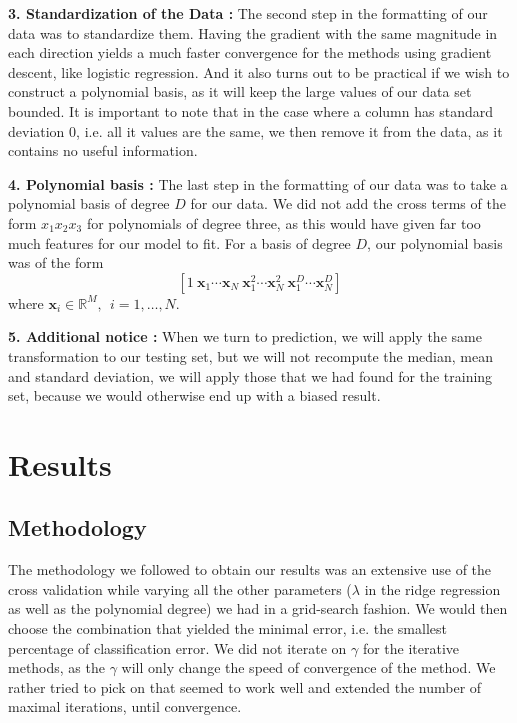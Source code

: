 \documentclass[10pt,conference,compsocconf]{IEEEtran}
\begin{document}
\textbf{3. Standardization of the Data :} The second step in the formatting of our data was to standardize them. Having the gradient with the same magnitude in each direction yields a much faster convergence for the methods using gradient descent, like logistic regression. And it also turns out to be practical if we wish to construct a polynomial basis, as it will keep the large values of our data set bounded. It is important to note that in the case where a column has standard deviation $0$, i.e. all it values are the same, we then remove it from the data, as it contains no useful information.

\textbf{4. Polynomial basis :} The last step in the formatting of our data was to take a polynomial basis of degree $D$ for our data. We did not add the cross terms of the form $x_1x_2x_3$ for polynomials of degree three, as this would have given far too much features for our model to fit. For a basis of degree $D$, our polynomial basis was of the form
\begin{equation}
\left[1 ~ \mathbf{x}_1 \cdots \mathbf{x}_N ~\mathbf{x}_1^2 \cdots \mathbf{x}_N^2 ~ \mathbf{x}_1^D \cdots \mathbf{x}_N^D \right]
\end{equation}
where $\mathbf{x}_i \in \mathbb{R}^M, ~~i =1,\ldots,N$. 

\textbf{5. Additional notice :} When we turn to prediction, we will apply the same transformation to our testing set, but we will not recompute the median, mean and standard deviation, we will apply those that we had found for the training set, because we would otherwise end up with a biased result.
\section{Results}
\subsection{Methodology}
The methodology we followed to obtain our results was an extensive use of the cross validation while varying all the other parameters ($\lambda$ in the ridge regression as well as the polynomial degree) we had in a grid-search fashion. We would then choose the combination that yielded the minimal error, i.e. the smallest percentage of classification error. We did not iterate on $\gamma$ for the iterative methods, as the $\gamma$ will only change the speed of convergence of the method. We rather tried to pick on that seemed to work well and extended the number of maximal iterations, until convergence. 
\end{document}
